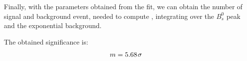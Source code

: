 Finally, with the parameters obtained from the fit, we can obtain the number of signal and background event, needed to compute , integrating over the $B_s^0$ peak and the exponential background.

The obtained significance is:
\begin{equation}
    m=5.68 \hspace{0.1em} \sigma
\end{equation}
